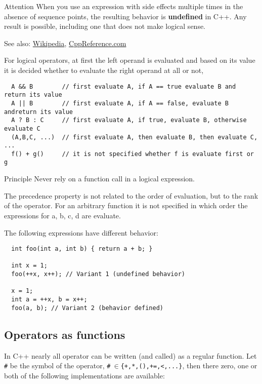 {\begin{guideline}{Attention}
  When you use an expression with side effects multiple times in the absence of sequence points, the resulting behavior is \textbf{undefined} in C++.
  Any result is possible, including one that does not make logical sense.
\end{guideline}

See also: \href{http://en.wikipedia.org/wiki/Sequence_point}{Wikipedia}, \href{http://en.cppreference.com/w/cpp/language/eval_order}{CppReference.com}

For logical operators, at first the left operand is evaluated and based on its value it is decided whether to evaluate the right operand
at all or not, \ie
\begin{verbatim}
  A && B        // first evaluate A, if A == true evaluate B and return its value
  A || B        // first evaluate A, if A == false, evaluate B andreturn its value
  A ? B : C     // first evaluate A, if true, evaluate B, otherwise evaluate C
  (A,B,C, ...)  // first evaluate A, then evaluate B, then evaluate C, ...
  f() + g()     // it is not specified whether f is evaluate first or g
\end{verbatim}

\begin{guideline}{Principle}
  Never rely on a function call in a logical expression.
\end{guideline}

\begin{rem}
  The precedence property is not related to the order of evaluation, but to the rank of the operator. For an arbitrary function  it
  is not specified in which order the expressions for a, b, c, d are evaluate.
\end{rem}

\begin{example}
  The following expressions have different behavior:
  \begin{verbatim}
  int foo(int a, int b) { return a + b; }

  int x = 1;
  foo(++x, x++); // Variant 1 (undefined behavior)

  x = 1;
  int a = ++x, b = x++;
  foo(a, b); // Variant 2 (behavior defined)
  \end{verbatim}
\end{example}


\subsection{Operators as functions}
In C++ nearly all operator can be written (and called) as a regular function. Let \texttt{\#} be the symbol of the operator, \eg
\texttt{\#$~\in$\{+,*,(),+=,<,...\}}, then there zero, one or both of the following implementations are available:

}
